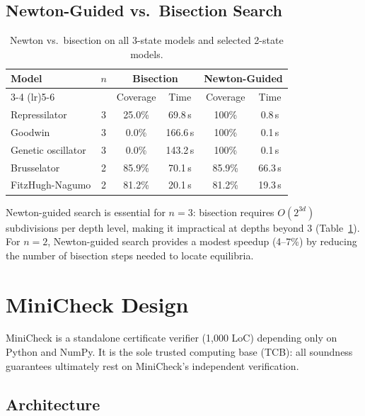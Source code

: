 \documentclass[11pt]{article}
\begin{document}
\subsection{Newton-Guided vs.\ Bisection Search}

\begin{table}[h]
\centering
\caption{Newton vs.\ bisection on all 3-state models and selected 2-state models.}
\label{tab:newton-ablation}
\small
\begin{tabular}{@{}lccccc@{}}
\toprule
Model & $n$ & \multicolumn{2}{c}{Bisection} & \multicolumn{2}{c}{Newton-Guided} \\
\cmidrule(lr){3-4} \cmidrule(lr){5-6}
 & & Coverage & Time & Coverage & Time \\
\midrule
Repressilator      & 3 & 25.0\% & 69.8\,s  & 100\% & 0.8\,s \\
Goodwin            & 3 & 0.0\%  & 166.6\,s & 100\% & 0.1\,s \\
Genetic oscillator & 3 & 0.0\%  & 143.2\,s & 100\% & 0.1\,s \\
Brusselator        & 2 & 85.9\% & 70.1\,s  & 85.9\% & 66.3\,s \\
FitzHugh-Nagumo    & 2 & 81.2\% & 20.1\,s  & 81.2\% & 19.3\,s \\
\bottomrule
\end{tabular}
\end{table}

Newton-guided search is essential for $n = 3$: bisection requires $O(2^{3d})$ subdivisions per depth level, making it impractical at depths beyond 3 (Table~\ref{tab:newton-ablation}).
For $n = 2$, Newton-guided search provides a modest speedup (4--7\%) by reducing the number of bisection steps needed to locate equilibria.

\section{MiniCheck Design}
\label{app:minicheck}

MiniCheck is a standalone certificate verifier (1{,}000 LoC) depending only on Python and NumPy.
It is the sole trusted computing base (TCB): all soundness guarantees ultimately rest on MiniCheck's independent verification.

\subsection{Architecture}
\end{document}

